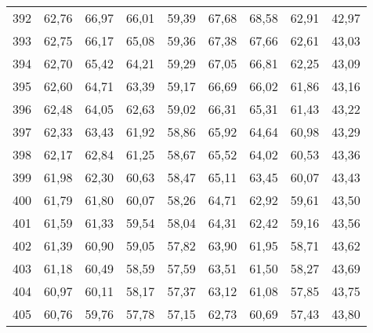 \begin{longtable}{c c c c c c c c c}
      392& 	62,76& 	66,97& 	66,01& 	59,39& 	67,68& 	68,58& 	62,91& 	42,97 \\
      393& 	62,75& 	66,17& 	65,08& 	59,36& 	67,38& 	67,66& 	62,61& 	43,03 \\
      394& 	62,70& 	65,42& 	64,21& 	59,29& 	67,05& 	66,81& 	62,25& 	43,09 \\
      395& 	62,60& 	64,71& 	63,39& 	59,17& 	66,69& 	66,02& 	61,86& 	43,16 \\
      396& 	62,48& 	64,05& 	62,63& 	59,02& 	66,31& 	65,31& 	61,43& 	43,22 \\
      397& 	62,33& 	63,43& 	61,92& 	58,86& 	65,92& 	64,64& 	60,98& 	43,29 \\
      398& 	62,17& 	62,84& 	61,25& 	58,67& 	65,52& 	64,02& 	60,53& 	43,36 \\
      399& 	61,98& 	62,30& 	60,63& 	58,47& 	65,11& 	63,45& 	60,07& 	43,43 \\
      400& 	61,79& 	61,80& 	60,07& 	58,26& 	64,71& 	62,92& 	59,61& 	43,50 \\
      401& 	61,59& 	61,33& 	59,54& 	58,04& 	64,31& 	62,42& 	59,16& 	43,56 \\
      402& 	61,39& 	60,90& 	59,05& 	57,82& 	63,90& 	61,95& 	58,71& 	43,62 \\
      403& 	61,18& 	60,49& 	58,59& 	57,59& 	63,51& 	61,50& 	58,27& 	43,69 \\
      404& 	60,97& 	60,11& 	58,17& 	57,37& 	63,12& 	61,08& 	57,85& 	43,75 \\
      405& 	60,76& 	59,76& 	57,78& 	57,15& 	62,73& 	60,69& 	57,43& 	43,80 \\
      \bottomrule
    \end{longtable}


